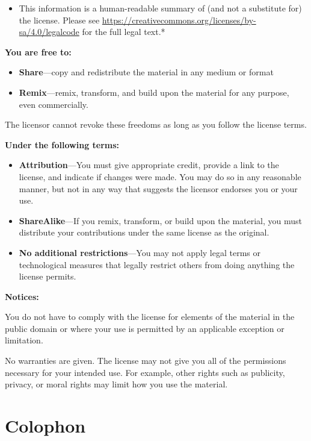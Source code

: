 \documentclass[
]{book}
\providecommand{\tightlist}{%
  \setlength{\itemsep}{0pt}\setlength{\parskip}{0pt}}
\begin{document}
\begin{itemize}
\tightlist
\item
  This information is a human-readable summary of (and not a substitute for) the license.
  Please see \url{https://creativecommons.org/licenses/by-sa/4.0/legalcode} for the full legal text.*
\end{itemize}

\textbf{You are free to:}

\begin{itemize}
\item
  \textbf{Share}---copy and redistribute the material in any medium or
  format
\item
  \textbf{Remix}---remix, transform, and build upon the material for any
  purpose, even commercially.
\end{itemize}

The licensor cannot revoke these freedoms as long as you follow the
license terms.

\textbf{Under the following terms:}

\begin{itemize}
\item
  \textbf{Attribution}---You must give appropriate credit, provide a link
  to the license, and indicate if changes were made. You may do so in
  any reasonable manner, but not in any way that suggests the licensor
  endorses you or your use.
\item
  \textbf{ShareAlike}---If you remix, transform, or build upon the material, you must distribute your contributions under the same license as the original.
\item
  \textbf{No additional restrictions}---You may not apply legal terms or
  technological measures that legally restrict others from doing
  anything the license permits.
\end{itemize}

\textbf{Notices:}

You do not have to comply with the license for elements of the
material in the public domain or where your use is permitted by an
applicable exception or limitation.

No warranties are given. The license may not give you all of the
permissions necessary for your intended use. For example, other rights
such as publicity, privacy, or moral rights may limit how you use the
material.

\chapter*{Colophon}\label{colophon}
\end{document}
